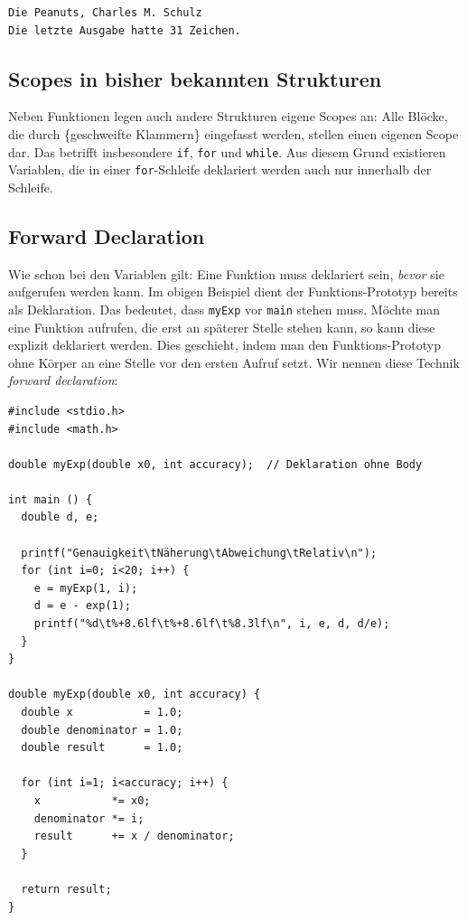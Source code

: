 \begin{cmdbox}
\begin{verbatim}
Die Peanuts, Charles M. Schulz
Die letzte Ausgabe hatte 31 Zeichen.
\end{verbatim}
\end{cmdbox}

\subsection{Scopes in bisher bekannten Strukturen}
Neben Funktionen legen auch andere Strukturen eigene Scopes an: Alle Blöcke, die durch \{geschweifte Klammern\} eingefasst werden, stellen einen eigenen Scope dar. Das betrifft insbesondere \texttt{if}, \texttt{for} und \texttt{while}. Aus diesem Grund existieren Variablen, die in einer \texttt{for}-Schleife deklariert werden auch nur innerhalb der Schleife.

\subsection{Forward Declaration} \label{sec:forwardDeclaration}
Wie schon bei den Variablen gilt: Eine Funktion muss deklariert sein, \emph{bevor} sie aufgerufen werden kann. Im obigen Beispiel dient der Funktions-Prototyp bereits als Deklaration. Das bedeutet, dass \texttt{myExp} vor \texttt{main} stehen muss. Möchte man eine Funktion aufrufen, die erst an späterer Stelle stehen kann, so kann diese explizit deklariert werden. Dies geschieht, indem man den Funktions-Prototyp ohne Körper an eine Stelle vor den ersten Aufruf setzt. Wir nennen diese Technik \emph{forward declaration}:

\begin{codebox}
\begin{verbatim}
#include <stdio.h>
#include <math.h>

double myExp(double x0, int accuracy);  // Deklaration ohne Body

int main () {
  double d, e;
  
  printf("Genauigkeit\tNäherung\tAbweichung\tRelativ\n");  
  for (int i=0; i<20; i++) {
    e = myExp(1, i);
    d = e - exp(1);
    printf("%d\t%+8.6lf\t%+8.6lf\t%8.3lf\n", i, e, d, d/e);
  }
}

double myExp(double x0, int accuracy) {
  double x           = 1.0;
  double denominator = 1.0;
  double result      = 1.0;
  
  for (int i=1; i<accuracy; i++) {
    x           *= x0;
    denominator *= i;
    result      += x / denominator;
  }
  
  return result;
}
\end{verbatim}
\end{codebox}

